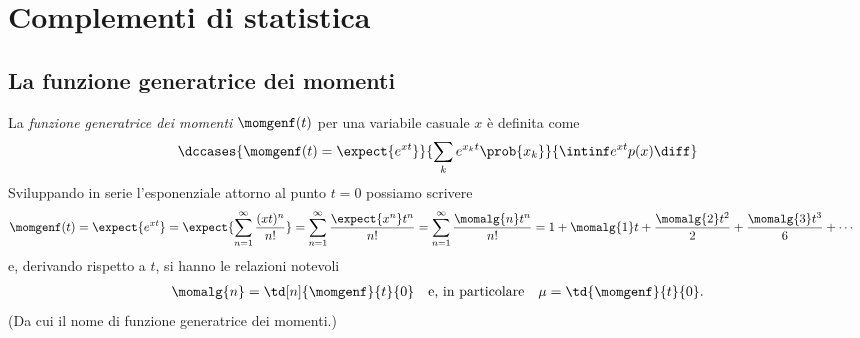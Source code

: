 \chapter{Complementi di statistica}
\label{chap:complementi}


\section{La funzione generatrice dei momenti}

La \emph{funzione generatrice dei momenti} $\momgenf(t)$ per una variabile
casuale $x$ è definita come
\begin{align}
  \dccases{\momgenf(t) = \expect{e^{xt}}}%
          {\sum_k e^{x_kt} \prob{x_k}}%
          {\intinf e^{xt} p(x) \diff}
\end{align}
Sviluppando in serie l'esponenziale attorno al punto $t = 0$ possiamo scrivere
\begin{align*}
  \momgenf(t) & = \expect{e^{xt}} =
  \expect{\sum_{n = 1}^{\infty} \frac{(xt)^n}{n!}} =
  \sum_{n = 1}^{\infty} \frac{\expect{x^n}t^n}{n!} = 
  \sum_{n = 1}^{\infty} \frac{\momalg{n}t^n}{n!} =
  1 + \momalg{1}t + \frac{\momalg{2}t^2}{2} + \frac{\momalg{3}t^3}{6} +
  \cdots
\end{align*}
e, derivando rispetto a $t$, si hanno le relazioni notevoli
\begin{align} \label{eq:mgf_mean}
  \momalg{n} = \td[n]{\momgenf}{t}{0}
  \quad\text{e, in particolare}\quad
  \mu = \td{\momgenf}{t}{0}.
\end{align}
(Da cui il nome di funzione generatrice dei momenti.)

